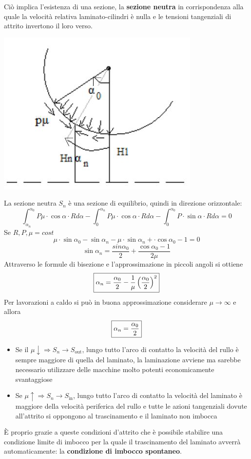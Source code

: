 \documentclass[a4paper, 15pt]{article}
\newcommand{\compresslist}{ %
			\setlength{\itemsep}{1pt}
			\setlength{\parskip}{0pt}
			\setlength{\parsep}{0pt}
		}
\begin{document}
	Ciò implica l'esistenza di una sezione, la \textbf{sezione neutra} in corrispondenza alla quale la velocità relativa laminato-cilindri è nulla e le tensioni tangenziali di attrito invertono il loro verso.
\begin{center}
	\includegraphics[width=0.5\linewidth]{figures/def8}
\end{center}
	La sezione neutra $S_n$ è una sezione di equilibrio, quindi in direzione orizzontale: 
	\[\int_{\alpha_n}^{\alpha_0}P\mu\cdot\cos\alpha\cdot Rd\alpha - \int_{0}^{\alpha_n}P\mu\cdot\cos\alpha\cdot Rd\alpha - \int_{0}^{\alpha_0}P\cdot\sin\alpha\cdot Rd\alpha = 0\]
	Se $R, P, \mu = cost$ 
	\[\mu\cdot\sin\alpha_0-\sin\alpha_n - \mu\cdot\sin\alpha_n + \cdot\cos\alpha_0-1 = 0\]
	\[\sin\alpha_n = \dfrac{sin\alpha_0}{2} + \dfrac{\cos\alpha_0-1}{2\mu}\]
	Attraverso le formule di bisezione e l'approssimazione in piccoli angoli si ottiene 
	\begin{equation}\label{eq:3}
		\boxed{\alpha_n = {\alpha_0\over2} - {1\over\mu}\left(\alpha_0\over2\right)^2}
	\end{equation}
	Per lavorazioni a caldo si può in buona approssimazione considerare $\mu\rightarrow\infty$ e allora
	\begin{equation}\label{eq:4}
		\boxed{\alpha_n = {\alpha_0\over2}}
	\end{equation}
	\begin{itemize}\compresslist
		\item Se il $\mu\downarrow \Rightarrow S_n\rightarrow S_{\text{out}}$, lungo tutto l'arco di contatto la velocità del rullo è sempre maggiore di quella del laminato, la laminazione avviene ma sarebbe necessario utilizzare delle macchine molto potenti economicamente svantaggiose
		\item Se $\mu\uparrow \Rightarrow S_n\rightarrow S_{\text{in}}$, lungo tutto l'arco di contatto la velocità del laminato è maggiore della velocità periferica del rullo e tutte le azioni tangenziali dovute all'attrito si oppongono al trascinamento e il laminato non imbocca
	\end{itemize}
	È proprio grazie a queste condizioni d'attrito che è possibile stabilire una condizione limite di imbocco per la quale il trascinamento del laminato avverrà automaticamente: la \textbf{condizione di imbocco spontaneo}.
	
\end{document}
